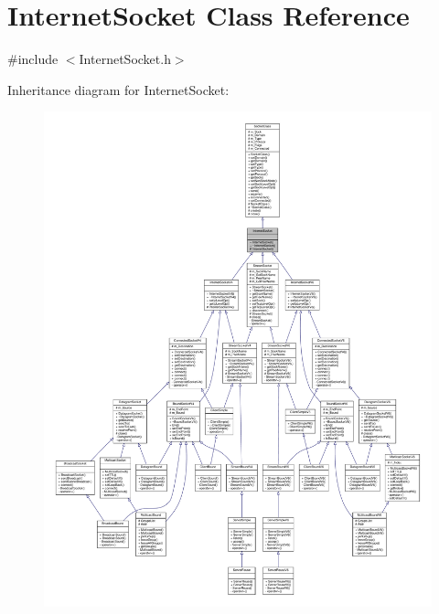 \hypertarget{classInternetSocket}{}\section{Internet\+Socket Class Reference}
\label{classInternetSocket}


{\ttfamily \#include $<$Internet\+Socket.\+h$>$}



Inheritance diagram for Internet\+Socket\+:\nopagebreak
\begin{figure}[H]
\begin{center}
\leavevmode
\includegraphics[width=350pt]{classInternetSocket__inherit__graph}
\end{center}
\end{figure}
